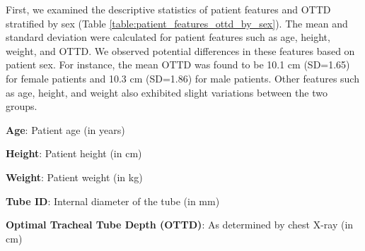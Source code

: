 \documentclass[11pt]{article}
\begin{document}
First, we examined the descriptive statistics of patient features and OTTD stratified by sex (Table \ref{table:patient_features_ottd_by_sex}). The mean and standard deviation were calculated for patient features such as age, height, weight, and OTTD. We observed potential differences in these features based on patient sex. For instance, the mean OTTD was found to be 10.1 cm (SD=1.65) for female patients and 10.3 cm (SD=1.86) for male patients. Other features such as age, height, and weight also exhibited slight variations between the two groups.

\begin{table}[h]
\caption{Descriptive statistics of patient features and OTTD stratified by sex}
\label{table:patient_features_ottd_by_sex}
\begin{threeparttable}
\renewcommand{\TPTminimum}{\linewidth}
\begin{tablenotes}
\footnotesize
\item \textbf{Age}: Patient age (in years)
\item \textbf{Height}: Patient height (in cm)
\item \textbf{Weight}: Patient weight (in kg)
\item \textbf{Tube ID}: Internal diameter of the tube (in mm)
\item \textbf{Optimal Tracheal Tube Depth (OTTD)}: As determined by chest X-ray (in cm)
\end{tablenotes}
\end{threeparttable}
\end{table}
\end{document}
